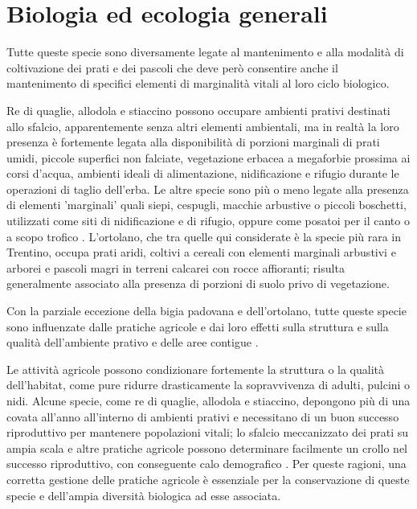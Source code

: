 \documentclass[10pt,twoside,openany,x11names,svgnames,italian,a5paper,dvipsnames,table]{memoir}
\begin{document}
\section{Biologia ed ecologia generali}
Tutte queste specie sono diversamente legate al mantenimento e alla modalità di coltivazione dei prati e dei pascoli che deve però consentire anche il mantenimento di specifici elementi di marginalità vitali al loro ciclo biologico. 

Re di quaglie, allodola e stiaccino possono occupare ambienti prativi destinati allo sfalcio, apparentemente senza altri elementi ambientali, ma in realtà la loro presenza è fortemente legata alla disponibilità di porzioni marginali di prati umidi, piccole superfici non falciate, vegetazione erbacea a megaforbie prossima ai corsi d’acqua, ambienti ideali di alimentazione, nidificazione e rifugio durante le operazioni di taglio dell’erba. Le altre specie sono più o meno legate alla presenza di elementi 'marginali' quali siepi, cespugli, macchie arbustive o piccoli boschetti, utilizzati come siti di nidificazione e di rifugio, oppure come posatoi per il canto o a scopo trofico \cite{Cramp98}. L’ortolano, che tra quelle qui considerate è la specie più rara in Trentino, occupa prati aridi, coltivi a cereali con elementi marginali arbustivi e arborei e pascoli magri in terreni calcarei con rocce affioranti; risulta generalmente associato alla presenza di porzioni di suolo privo di vegetazione. 

Con la parziale eccezione della bigia padovana e dell’ortolano, tutte queste specie sono influenzate dalle pratiche agricole e dai loro effetti sulla struttura e sulla qualità dell'ambiente prativo e delle aree contigue \cite{Green99} \cite{Donald02} \cite{Negri05} \cite{Wilson05} \cite{Brambilla13} \cite{Josefsson13}.

Le attività agricole possono condizionare fortemente la struttura o la qualità dell'habitat, come pure ridurre drasticamente la sopravvivenza di adulti, pulcini o nidi. Alcune specie, come re di quaglie, allodola e stiaccino, depongono più di una covata all'anno all'interno di ambienti prativi e necessitano di un buon successo riproduttivo per mantenere popolazioni vitali; lo sfalcio meccanizzato dei prati su ampia scala e altre pratiche agricole possono determinare facilmente un crollo nel successo riproduttivo, con conseguente calo demografico \cite{Crockford96} \cite{Brambilla13}. Per queste ragioni, una corretta gestione delle pratiche agricole è essenziale per la conservazione di queste specie e dell'ampia diversità biologica ad esse associata.
\end{document}
